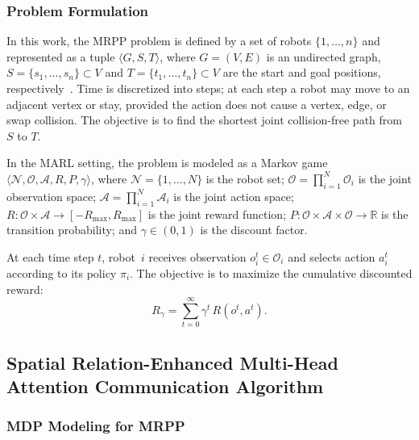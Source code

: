 \documentclass[conference]{IEEEtran}
\begin{document}
\subsubsection{Problem Formulation}

In this work, the MRPP problem is defined by a set of robots
$\{1,\ldots,n\}$ and represented as a tuple
$\langle G, S, T \rangle$, where $G=(V,E)$ is an undirected graph,
$S=\{s_1,\ldots,s_n\}\subset V$ and
$T=\{t_1,\ldots,t_n\}\subset V$ are the start and goal positions,
respectively~\cite{chung2024review}.
Time is discretized into steps; at each step a robot may move to
an adjacent vertex or stay, provided the action does not cause a
vertex, edge, or swap collision.
The objective is to find the shortest joint collision-free path
from $S$ to $T$.

In the MARL setting, the problem is modeled as a Markov game
$\langle \mathcal{N}, \mathcal{O}, \mathcal{A}, R, P, \gamma
\rangle$, where
$\mathcal{N}=\{1,\ldots,N\}$ is the robot set;
$\mathcal{O}=\prod_{i=1}^{N}\mathcal{O}_i$ is the joint
observation space;
$\mathcal{A}=\prod_{i=1}^{N}\mathcal{A}_i$ is the joint action
space;
$R:\mathcal{O}\times\mathcal{A}\to[-R_{\max},R_{\max}]$ is the
joint reward function;
$P:\mathcal{O}\times\mathcal{A}\times\mathcal{O}\to\mathbb{R}$
is the transition probability; and
$\gamma\in(0,1)$ is the discount factor.

At each time step $t$, robot~$i$ receives observation
$o_i^t\in\mathcal{O}_i$ and selects action $a_i^t$ according to
its policy $\pi_i$.
The objective is to maximize the cumulative discounted reward:
\begin{equation}\label{eq:return}
  R_\gamma = \sum_{t=0}^{\infty} \gamma^t\, R(o^t, a^t).
\end{equation}

\subsection{Spatial Relation-Enhanced Multi-Head Attention
Communication Algorithm}

\subsubsection{MDP Modeling for MRPP}
\end{document}
